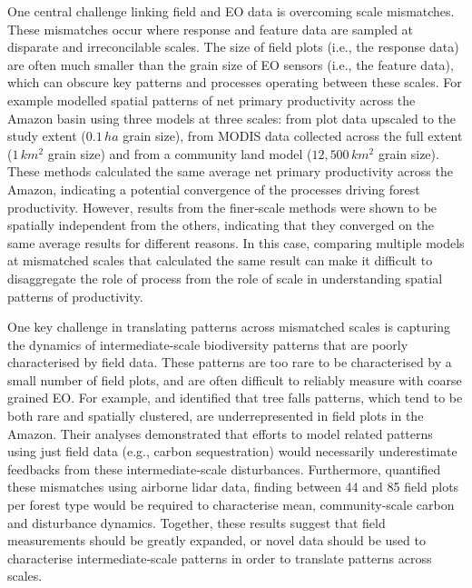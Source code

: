 One central challenge linking field and EO data is overcoming scale mismatches. These mismatches occur where response and feature data are sampled at disparate and irreconcilable scales. The size of field plots (i.e., the response data) are often much smaller than the grain size of EO sensors (i.e., the feature data), which can obscure key patterns and processes operating between these scales. For example \cite{Cleveland2015-zt} modelled spatial patterns of net primary productivity across the Amazon basin using three models at three scales: from plot data upscaled to the study extent ($0.1\, ha$ grain size), from MODIS data collected across the full extent ($1\, km^2$ grain size) and from a community land model ($12,500\, km^2$ grain size). These methods calculated the same average net primary productivity across the Amazon, indicating a potential convergence of the processes driving forest productivity. However, results from the finer‐scale methods were shown to be spatially independent from the others, indicating that they converged on the same average results for different reasons. In this case, comparing multiple models at mismatched scales that calculated the same result can make it difficult to disaggregate the role of process from the role of scale in understanding spatial patterns of productivity.

One key challenge in translating patterns across mismatched scales is capturing the dynamics of intermediate‐scale biodiversity patterns that are poorly characterised by field data. These patterns are too rare to be characterised by a small number of field plots, and are often difficult to reliably measure with coarse grained EO. For example, \cite{Fisher2008-sm} and \cite{Chambers2009-bl} identified that tree falls patterns, which tend to be both rare and spatially clustered, are underrepresented in field plots in the Amazon. Their analyses demonstrated that efforts to model related patterns using just field data (e.g., carbon sequestration) would necessarily underestimate feedbacks from these intermediate‐scale disturbances. Furthermore, \cite{Marvin2014-ms} quantified these mismatches using airborne lidar data, finding between 44 and 85 field plots per forest type would be required to characterise mean, community‐scale carbon and disturbance dynamics. Together, these results suggest that field measurements should be greatly expanded, or novel data should be used to characterise intermediate‐scale patterns in order to translate patterns across scales.

